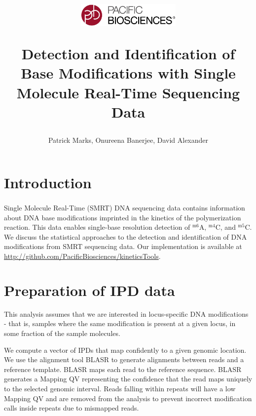 \documentclass[pdftex]{article}
\newcommand{\mC}[1]{$^\textrm{m#1}$C}
\newcommand{\mA}{$^\textrm{m6}$A}
\begin{document}
\title{\begin{center}\includegraphics[width=2in]{logo.jpg}\end{center}\vspace{0.5cm}
Detection and Identification of Base Modifications with Single Molecule Real-Time Sequencing Data}
\author{Patrick Marks, Onureena Banerjee, David Alexander}
\maketitle


\pagestyle{headings}

\section{Introduction}
Single Molecule Real-Time (SMRT\textsuperscript{\textregistered}) DNA sequencing\cite{eid2009real} data contains information about DNA base modifications imprinted in the kinetics of the polymerization reaction\cite{flusberg2010direct}.  This data enables single-base resolution detection of \mA, \mC{4}, and \mC{5}\cite{clark2012characterization}. We discuss the statistical approaches to the detection and identification of DNA modifications from SMRT sequencing data.  Our implementation is available at \url{http://github.com/PacificBiosciences/kineticsTools}.


\section{Preparation of IPD data}
\label{sec:prep}

This analysis assumes that we are interested in locus-specific DNA modifications - that is, samples where the same modification is present at a given locus, in some fraction of the sample molecules.  

We compute a vector of IPDs that map confidently to a given genomic location. We use the alignment tool BLASR \cite{blasr} to generate alignments between reads and a reference template.   BLASR maps each read to the reference sequence. BLASR generates a Mapping QV representing the confidence that the read maps uniquely to the selected genomic interval.  Reads falling within repeats will have a low Mapping QV and are removed from the analysis to prevent incorrect modification calls inside repeats due to mismapped reads.
\end{document}
